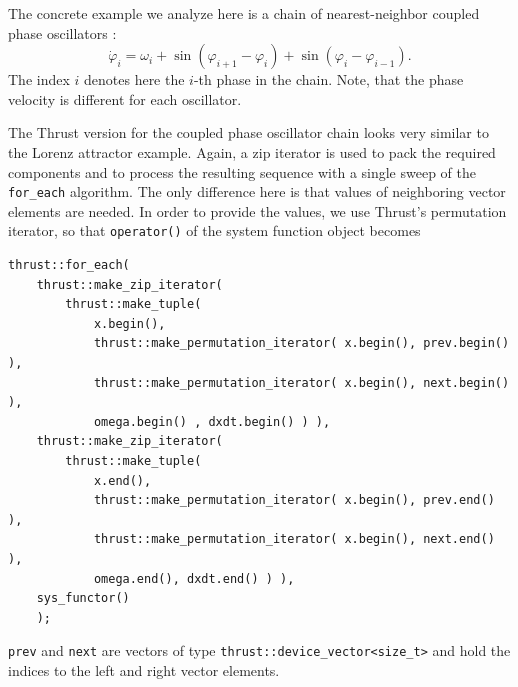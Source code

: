 \documentclass[final]{siamltex}
\newcommand{\code}[1]{\lstinline|#1|}
\begin{document}


The concrete example we analyze here is a chain of nearest-neighbor
coupled phase oscillators \cite{Cohen-Rand-Holmes-82}:
\begin{equation} \label{eq:phasesystem}
    \dot{\varphi}_i = \omega_i + \sin( \varphi_{i+1} - \varphi_i) + \sin( \varphi_i
    - \varphi_{i-1}).
\end{equation}
The index $i$ denotes here the $i$-th phase in the chain. Note, that
the phase velocity is different for each oscillator.

The Thrust version for the coupled phase oscillator chain looks very similar to
the Lorenz attractor example. Again, a zip iterator is used to pack the required
components and to process the resulting sequence with a single sweep of the
\code{for_each} algorithm. The only difference here is that values of
neighboring vector elements are needed. In order to provide the values, we use Thrust's
permutation iterator, so that \code{operator()} of the system function object becomes
\begin{lstlisting}
thrust::for_each(
    thrust::make_zip_iterator(
        thrust::make_tuple(
            x.begin(),
            thrust::make_permutation_iterator( x.begin(), prev.begin() ),
            thrust::make_permutation_iterator( x.begin(), next.begin() ),
            omega.begin() , dxdt.begin() ) ),
    thrust::make_zip_iterator(
        thrust::make_tuple(
            x.end(),
            thrust::make_permutation_iterator( x.begin(), prev.end() ),
            thrust::make_permutation_iterator( x.begin(), next.end() ),
            omega.end(), dxdt.end() ) ),
    sys_functor()
    );
\end{lstlisting}
\code{prev} and \code{next} are vectors of type
\code{thrust::device_vector<size_t>} and hold the indices to the left and right vector
elements.
\end{document}
